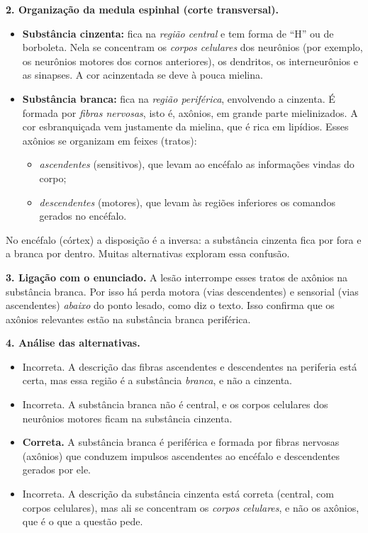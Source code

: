 \documentclass{article}%
\begin{document}
\textbf{2. Organização da medula espinhal (corte transversal).}
\begin{itemize}
  \item \textbf{Substância cinzenta:} fica na \emph{região central} e tem forma de ``H'' ou de borboleta. Nela se concentram os \emph{corpos celulares} dos neurônios (por exemplo, os neurônios motores dos cornos anteriores), os dendritos, os interneurônios e as sinapses. A cor acinzentada se deve à pouca mielina.
  \item \textbf{Substância branca:} fica na \emph{região periférica}, envolvendo a cinzenta. É formada por \emph{fibras nervosas}, isto é, axônios, em grande parte mielinizados. A cor esbranquiçada vem justamente da mielina, que é rica em lipídios. Esses axônios se organizam em feixes (tratos):
  \begin{itemize}
    \item \emph{ascendentes} (sensitivos), que levam ao encéfalo as informações vindas do corpo;
    \item \emph{descendentes} (motores), que levam às regiões inferiores os comandos gerados no encéfalo.
  \end{itemize}
\end{itemize}
No encéfalo (córtex) a disposição é a inversa: a substância cinzenta fica por fora e a branca por dentro. Muitas alternativas exploram essa confusão.

\textbf{3. Ligação com o enunciado.} A lesão interrompe esses tratos de axônios na substância branca. Por isso há perda motora (vias descendentes) e sensorial (vias ascendentes) \emph{abaixo} do ponto lesado, como diz o texto. Isso confirma que os axônios relevantes estão na substância branca periférica.

\textbf{4. Análise das alternativas.}
\begin{itemize}
  \item[(a)] Incorreta. A descrição das fibras ascendentes e descendentes na periferia está certa, mas essa região é a substância \emph{branca}, e não a cinzenta.
  \item[(b)] Incorreta. A substância branca não é central, e os corpos celulares dos neurônios motores ficam na substância cinzenta.
  \item[(c)] \textbf{Correta.} A substância branca é periférica e formada por fibras nervosas (axônios) que conduzem impulsos ascendentes ao encéfalo e descendentes gerados por ele.
  \item[(d)] Incorreta. A descrição da substância cinzenta está correta (central, com corpos celulares), mas ali se concentram os \emph{corpos celulares}, e não os axônios, que é o que a questão pede.
\end{itemize}
\end{document}
